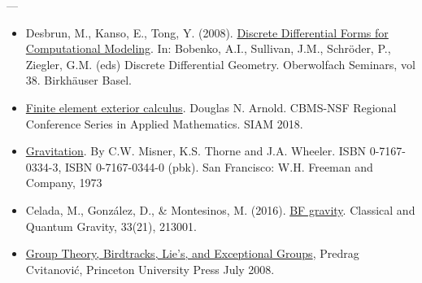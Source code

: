 \documentclass[9pt, svgnames, aspectratio=32, handout]{beamer}
\newenvironment{tframe}[1][]{%
  \begin{frame}[fragile,environment=tframe]{%
    \normalsize{{\bfseries \secname} --- \small{\subsecname} #1}%
  }%
}{%
  \end{frame}%
}
\begin{document}
\begin{tframe}
\begin{itemize}
\item Desbrun, M., Kanso, E., Tong, Y. (2008). \href{https://link.springer.com/chapter/10.1007/978-3-7643-8621-4\_16}{Discrete Differential Forms for Computational Modeling}. In: Bobenko, A.I., Sullivan, J.M., Schröder, P., Ziegler, G.M. (eds) Discrete Differential Geometry. Oberwolfach Seminars, vol 38. Birkhäuser Basel.
\item \href{https://doi.org/10.1137/1.9781611975543}{Finite element exterior calculus}. Douglas N. Arnold. CBMS-NSF Regional Conference Series in Applied Mathematics. SIAM 2018.
\item \href{https://ui.adsabs.harvard.edu/abs/1973grav.book.....M/abstract}{Gravitation}. By C.W. Misner, K.S. Thorne and J.A. Wheeler. ISBN 0-7167-0334-3, ISBN 0-7167-0344-0 (pbk). San Francisco: W.H. Freeman and Company, 1973
\item Celada, M., González, D., \& Montesinos, M. (2016). \href{https://arxiv.org/abs/1610.02020}{BF gravity}. Classical and Quantum Gravity, 33(21), 213001.
\item \href{https://birdtracks.eu/}{Group Theory, Birdtracks, Lie’s, and Exceptional Groups}, Predrag Cvitanović, Princeton University Press July 2008.
\end{itemize}
\end{tframe}

\end{document}

